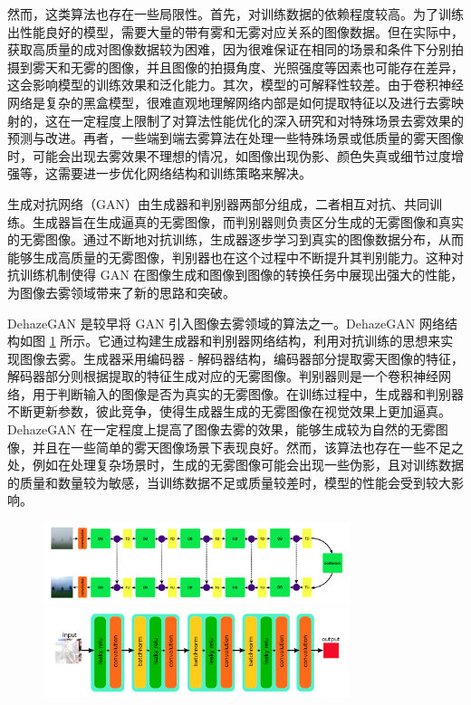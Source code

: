 然而，这类算法也存在一些局限性。首先，对训练数据的依赖程度较高。为了训练出性能良好的模型，需要大量的带有雾和无雾对应关系的图像数据。但在实际中，获取高质量的成对图像数据较为困难，因为很难保证在相同的场景和条件下分别拍摄到雾天和无雾的图像，并且图像的拍摄角度、光照强度等因素也可能存在差异，这会影响模型的训练效果和泛化能力。其次，模型的可解释性较差。由于卷积神经网络是复杂的黑盒模型，很难直观地理解网络内部是如何提取特征以及进行去雾映射的，这在一定程度上限制了对算法性能优化的深入研究和对特殊场景去雾效果的预测与改进。再者，一些端到端去雾算法在处理一些特殊场景或低质量的雾天图像时，可能会出现去雾效果不理想的情况，如图像出现伪影、颜色失真或细节过度增强等，这需要进一步优化网络结构和训练策略来解决。

生成对抗网络（GAN）\cite{gan}由生成器和判别器两部分组成，二者相互对抗、共同训练。生成器旨在生成逼真的无雾图像，而判别器则负责区分生成的无雾图像和真实的无雾图像。通过不断地对抗训练，生成器逐步学习到真实的图像数据分布，从而能够生成高质量的无雾图像，判别器也在这个过程中不断提升其判别能力。这种对抗训练机制使得 GAN 在图像生成和图像到图像的转换任务中展现出强大的性能，为图像去雾领域带来了新的思路和突破。

DehazeGAN\cite{raj2020single} 是较早将 GAN 引入图像去雾领域的算法之一。DehazeGAN 网络结构如图 \ref{fig:dehazegan} 所示。它通过构建生成器和判别器网络结构，利用对抗训练的思想来实现图像去雾。生成器采用编码器 - 解码器结构，编码器部分提取雾天图像的特征，解码器部分则根据提取的特征生成对应的无雾图像。判别器则是一个卷积神经网络，用于判断输入的图像是否为真实的无雾图像。在训练过程中，生成器和判别器不断更新参数，彼此竞争，使得生成器生成的无雾图像在视觉效果上更加逼真。DehazeGAN 在一定程度上提高了图像去雾的效果，能够生成较为自然的无雾图像，并且在一些简单的雾天图像场景下表现良好。然而，该算法也存在一些不足之处，例如在处理复杂场景时，生成的无雾图像可能会出现一些伪影，且对训练数据的质量和数量较为敏感，当训练数据不足或质量较差时，模型的性能会受到较大影响。

\begin{figure}[ht]
    \centering
    \includegraphics[width=0.8\textwidth]{../figure/dehazeGANG.png}
    \\
    \includegraphics[width=0.8\textwidth]{../figure/dehazeGAND.png}
    \captionsetup{font=footnotesize}
    \label{fig:dehazegan}
\end{figure}

